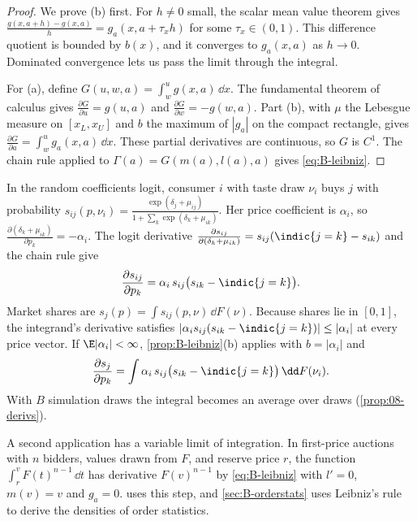 \begin{proof}
We prove (b) first. For $h \neq 0$ small, the scalar mean value theorem gives
$\frac{g(x, a + h) - g(x, a)}{h} = g_a(x, a + \tau_x h)$ for some $\tau_x \in (0, 1)$. This difference quotient is
bounded by $b(x)$, and it converges to $g_a(x, a)$ as $h \to 0$. Dominated convergence lets us pass the limit
through the integral.

For (a), define $G(u, w, a) = \int_w^u g(x, a)\,\dd x$. The fundamental theorem of calculus gives
$\frac{\partial G}{\partial u} = g(u, a)$ and $\frac{\partial G}{\partial w} = -g(w, a)$. Part (b), with $\mu$ the Lebesgue
measure on $[x_L, x_U]$ and $b$ the maximum of $|g_a|$ on the compact rectangle, gives
$\frac{\partial G}{\partial a} = \int_w^u g_a(x, a)\,\dd x$. These partial derivatives are continuous, so $G$ is $C^1$. The
chain rule applied to $\Gamma(a) = G(m(a), l(a), a)$ gives \eqref{eq:B-leibniz}.
\end{proof}

\begin{example}\label{ex:B-rc-derivatives}
In the random coefficients logit, consumer $i$ with taste draw $\nu_i$ buys $j$ with probability
$s_{ij}(p, \nu_i) = \frac{\exp(\delta_j + \mu_{ij})}{1 + \sum_{k}\exp(\delta_k + \mu_{ik})}$. Her price coefficient is $\alpha_i$, so
$\frac{\partial(\delta_k + \mu_{ik})}{\partial p_k} = -\alpha_i$. The logit derivative
$\frac{\partial s_{ij}}{\partial(\delta_k + \mu_{ik})} = s_{ij}(\indic\{j = k\} - s_{ik})$ and the chain rule give
\begin{equation*}
\frac{\partial s_{ij}}{\partial p_k} = \alpha_i\, s_{ij}\big(s_{ik} - \indic\{j = k\}\big) .
\end{equation*}
Market shares are $s_j(p) = \int s_{ij}(p, \nu)\,\dd F(\nu)$. Because shares lie in $[0, 1]$, the integrand's derivative
satisfies $|\alpha_i s_{ij}(s_{ik} - \indic\{j = k\})| \leq |\alpha_i|$ at every price vector. If $\E|\alpha_i| < \infty$,
\cref{prop:B-leibniz}(b) applies with $b = |\alpha_i|$ and
\begin{equation}\label{eq:B-rc-derivative}
\frac{\partial s_j}{\partial p_k} = \int \alpha_i\, s_{ij}\big(s_{ik} - \indic\{j = k\}\big)\,\dd F(\nu_i) .
\end{equation}
With $B$ simulation draws the integral becomes an average over draws (\cref{prop:08-derivs}).
\end{example}

A second application has a variable limit of integration. In first-price auctions with $n$ bidders, values drawn
from $F$, and reserve price $r$, the function $\int_r^v F(t)^{n - 1}\,\dd t$ has derivative $F(v)^{n - 1}$ by
\eqref{eq:B-leibniz} with $l' = 0$, $m(v) = v$ and $g_a = 0$.  uses this step, and
\cref{sec:B-orderstats} uses Leibniz's rule to derive the densities of order statistics.

